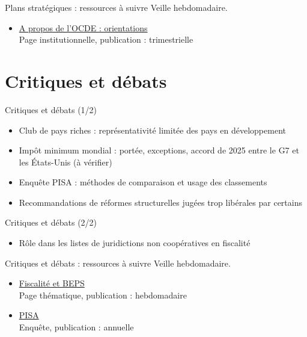 \documentclass[aspectratio=169,11pt]{beamer}
\begin{document}
\begin{frame}{Plans stratégiques : ressources à suivre}
\small
Veille hebdomadaire.
\begin{itemize}
\item \href{https://www.oecd.org/en/about.html}{A propos de l'OCDE : orientations}\\{\footnotesize Page institutionnelle, publication : trimestrielle}
\end{itemize}
\end{frame}

\section{Critiques et débats}
\begin{frame}{Critiques et débats (1/2)}
\begin{itemize}
\item Club de pays riches : représentativité limitée des pays en développement
\item Impôt minimum mondial : portée, exceptions, accord de 2025 entre le G7 et les États-Unis (à vérifier)
\item Enquête PISA : méthodes de comparaison et usage des classements
\item Recommandations de réformes structurelles jugées trop libérales par certains
\end{itemize}
\end{frame}

\begin{frame}{Critiques et débats (2/2)}
\begin{itemize}
\item Rôle dans les listes de juridictions non coopératives en fiscalité
\end{itemize}
\end{frame}

\begin{frame}{Critiques et débats : ressources à suivre}
\small
Veille hebdomadaire.
\begin{itemize}
\item \href{https://www.oecd.org/en/topics/policy-areas/tax.html}{Fiscalité et BEPS}\\{\footnotesize Page thématique, publication : hebdomadaire}
\item \href{https://www.oecd.org/en/about/programmes/pisa.html}{PISA}\\{\footnotesize Enquête, publication : annuelle}
\end{itemize}
\end{frame}
\end{document}
